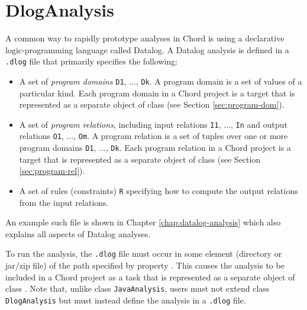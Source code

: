 
\section{DlogAnalysis}
\label{sec:dlog-analysis}

A common way to rapidly prototype analyses in Chord is using a declarative
logic-programming language called Datalog.
A Datalog analysis is defined in a {\tt .dlog} file that primarily specifies the following:
\begin{itemize}
\item
A set of {\it program domains} {\tt D1}, ..., {\tt Dk}.
A program domain is a set of values of a particular kind.
Each program domain in a Chord project is a target that is
represented as a separate object of class  (see Section \ref{sec:program-dom}).
\item
A set of {\it program relations}, including input
relations {\tt I1}, ..., {\tt In} and output relations {\tt O1}, ..., {\tt Om}.
A program relation is a set of tuples over one or more program domains {\tt D1}, ..., {\tt Dk}.
Each program relation in a Chord project is a target that is
represented as a separate object of class  (see Section \ref{sec:program-rel}).
\item
A set of rules (constraints) {\tt R} specifying how to compute the output relations from the input
relations.
\end{itemize}
An example such file is shown in Chapter \ref{chap:datalog-analysis} which also explains all aspects
of Datalog analyses.

To run the analysis, the {\tt .dlog} file must occur in some element (directory or jar/zip file)
of the path specified by property .
This causes the analysis to be included in a Chord project as a task that is
represented as a separate object of class .
Note that, unlike class {\tt JavaAnalysis}, users must not extend class {\tt DlogAnalysis} 
but must instead define the analysis in a {\tt .dlog} file.

